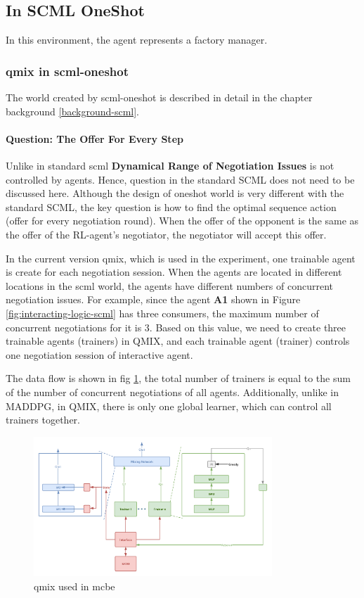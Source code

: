 \subsection{In SCML OneShot}
In this environment, the agent represents a factory manager.

\subsubsection{\gls{qmix} in \gls{scml-oneshot}} \label{methods:qmix-scml-oneshot}

The world created by \gls{scml-oneshot} is described in detail in the chapter background \ref{background-scml}. 

\paragraph{Question: The Offer For Every Step} Unlike in standard scml \textbf{Dynamical Range of Negotiation Issues} is not controlled by agents. Hence, question in the standard SCML does not need to be discussed here. Although the design of oneshot world is very different with the standard SCML, the key question is how to find the optimal sequence action (offer for every negotiation round). When the offer of the opponent is the same as the offer of the RL-agent's negotiator, the negotiator will accept this offer.

In the current version \gls{qmix}, which is used in the experiment, one trainable agent is create for each negotiation session. When the agents are located in different locations in the scml world, the agents have different numbers of concurrent negotiation issues. For example, since the agent \textbf{A1} shown in Figure \ref{fig:interacting-logic-scml} has three consumers, the maximum number of concurrent negotiations for it is 3. Based on this value, we need to create three trainable agents (trainers) in QMIX, and each trainable agent (trainer) controls one negotiation session of interactive agent.

The data flow is shown in fig \ref{fig:method-qmix-scml}, the total number of trainers is equal to the sum of the number of concurrent negotiations of all agents. Additionally, unlike in MADDPG, in QMIX, there is only one global learner, which can control all trainers together.

\begin{figure}[htbp]
\centering
\includegraphics[width=0.80\textwidth]{./images/scml-qmix.png}
\caption{\gls{qmix} used in \gls{mcbe}}
\label{fig:method-qmix-scml}
\end{figure}

